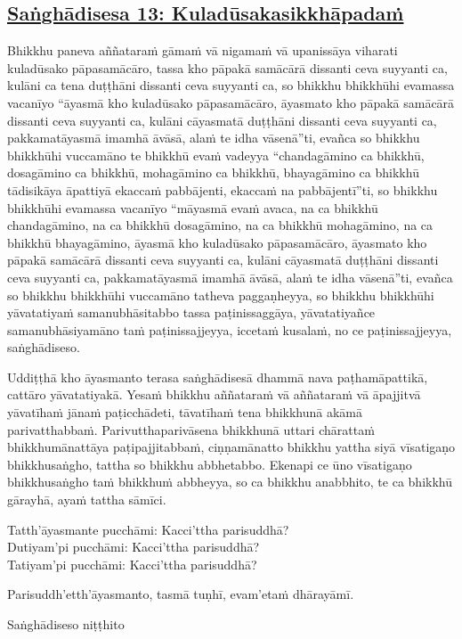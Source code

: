 \subsection*{\hyperref[comm13]{Saṅghādisesa 13: Kuladūsakasikkhāpadaṁ}}
\label{sd13}
Bhikkhu paneva aññataraṁ gāmaṁ vā nigamaṁ vā upanissāya viharati kuladūsako pāpasamācāro, tassa kho pāpakā samācārā dissanti ceva suyyanti ca, kulāni ca tena duṭṭhāni dissanti ceva suyyanti ca, so bhikkhu bhikkhūhi evamassa vacanīyo “āyasmā kho kuladūsako pāpasamācāro, āyasmato kho pāpakā samācārā dissanti ceva suyyanti ca, kulāni cāyasmatā duṭṭhāni dissanti ceva suyyanti ca, pakkamatāyasmā imamhā āvāsā, alaṁ te idha vāsenā”ti, evañca so bhikkhu bhikkhūhi vuccamāno te bhikkhū evaṁ vadeyya “chandagāmino ca bhikkhū, dosagāmino ca bhikkhū, mohagāmino ca bhikkhū, bhayagāmino ca bhikkhū tādisikāya āpattiyā ekaccaṁ pabbājenti, ekaccaṁ na pabbājentī”ti, so bhikkhu bhikkhūhi evamassa vacanīyo “māyasmā evaṁ avaca, na ca bhikkhū chandagāmino, na ca bhikkhū dosagāmino, na ca bhikkhū mohagāmino, na ca bhikkhū bhayagāmino, āyasmā kho kuladūsako pāpasamācāro, āyasmato kho pāpakā samācārā dissanti ceva suyyanti ca, kulāni cāyasmatā duṭṭhāni dissanti ceva suyyanti ca, pakkamatāyasmā imamhā āvāsā, alaṁ te idha vāsenā”ti, evañca so bhikkhu bhikkhūhi vuccamāno tatheva paggaṇheyya, so bhikkhu bhikkhūhi yāvatatiyaṁ samanubhāsitabbo tassa paṭinissaggāya, yāvatatiyañce samanubhāsiyamāno taṁ paṭinissajjeyya, iccetaṁ kusalaṁ, no ce paṭinissajjeyya, saṅghādiseso.

\medskip

\begin{center}
Uddiṭṭhā kho āyasmanto terasa saṅghādisesā dhammā nava paṭhamāpattikā, cattāro yāvatatiyakā. Yesaṁ bhikkhu aññataraṁ vā aññataraṁ vā āpajjitvā yāvatīhaṁ jānaṁ paṭicchādeti, tāvatīhaṁ tena bhikkhunā akāmā parivatthabbaṁ. Parivutthaparivāsena bhikkhunā uttari chārattaṁ bhikkhumānattāya paṭipajjitabbaṁ, ciṇṇamānatto bhikkhu yattha siyā vīsatigaṇo bhikkhusaṅgho, tattha so bhikkhu abbhetabbo. Ekenapi ce ūno vīsatigaṇo bhikkhusaṅgho taṁ bhikkhuṁ abbheyya, so ca bhikkhu anabbhito, te ca bhikkhū gārayhā, ayaṁ tattha sāmīci.

\smallskip

Tatth'āyasmante pucchāmi: Kacci'ttha parisuddhā?\\
Dutiyam'pi pucchāmi: Kacci'ttha parisuddhā?\\
Tatiyam'pi pucchāmi: Kacci'ttha parisuddhā?

\smallskip

Parisuddh'etth'āyasmanto, tasmā tuṇhī, evam'etaṁ dhārayāmī.
\end{center}

\begin{outro}
  Saṅghādiseso niṭṭhito
\end{outro}

\clearpage
